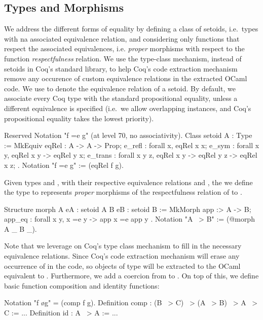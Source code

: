 \documentclass[anonymous, a4paper, UKenglish, cleveref, autoref, thm-restate]{lipics-v2021}
\begin{document}
\subsection{Types and Morphisms}
\label{sec:types-morphisms}
We address the different forms of equality by defining a class of setoids,
i.e.\ types with na associated equivalence relation, and considering only
functions that respect the associated equivalences, i.e. \emph{proper}
morphisms with respect to the function \emph{respectfulness} relation.  We use
the type-class mechanism, instead of setoids in Coq's standard library, to help
Coq's code extraction mechanism remove any occurence of custom equivalence
relations in the extracted OCaml code.  We use  to denote
the equivalence relation of a setoid. By default, we associate every Coq type
with the standard propositional equality, unless a different equivalence is
specified (i.e.\ we allow overlapping instances, and Coq's propositional
equality takes the lowest priority). 
\begin{coqcode}
Reserved Notation "f =e g" (at level 70, no associativity).
Class setoid A : Type :=
  MkEquiv
    { eqRel : A -> A -> Prop;
      e_refl : forall x, eqRel x x;
      e_sym : forall x y, eqRel x y -> eqRel y x;
      e_trans : forall x y z, eqRel x y -> eqRel y z -> eqRel x z;
    }.
Notation "f =e g" := (eqRel f g).
\end{coqcode}
Given types  and  , with their respective
equivalence relations  and
, the we define the type
 to represents \emph{proper} morphisms of the
respectfulness relation of  to .
\begin{coqcode}
Structure morph A {eA : setoid A} B {eB : setoid B} :=
  MkMorph
    { app :> A -> B;
      app_eq : forall x y, x =e y -> app x =e app y
    }.
Notation "A ~> B" := (@morph A _ B _).
\end{coqcode}
Note that we leverage on Coq's type class mechanism to fill in the necessary
equivalence relations. Since Coq's code extraction mechanism will erase any
occurrence of  in the code, so objects of type
 will be extracted to the OCaml equivalent to
. Furthermore, we add a coercion from  to .
On top of this, we define basic function composition and identity functions:
\begin{coqcode}
Notation "f \o g" = (comp f g).
Definition comp : (B ~> C) ~> (A ~> B) ~> A ~> C := ...
Definition id : A ~> A := ...
\end{coqcode}
\end{document}
